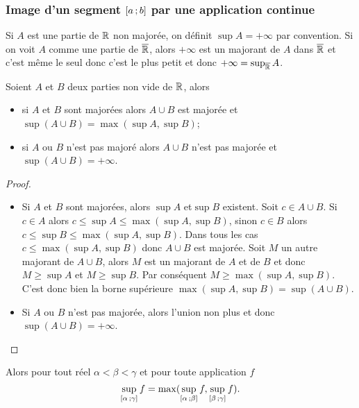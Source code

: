 \subsubsection[Image continue d'un segment]{Image d'un segment
\(\left[ a \, ; {} b \right]\) par une application continue}

Si \(A\) est une partie de \(\mathbb{R}\) non majorée, on définit \(\sup A = + \infty\)
par convention. Si on voit \(A\) comme une partie de \(\overline{\mathbb{R}}\), alors
\(+\infty\) est un majorant de \(A\) dans \(\overline{\mathbb{R}}\) et c'est même le seul donc
c'est le plus petit et donc \(+\infty=\sup_{\overline{\mathbb{R}}} A\).

\begin{lemme}
  Soient \(A\) et \(B\) deux parties non vide de \(\mathbb{R}\), alors
  \begin{itemize}
    \item si \(A\) et \(B\) sont majorées alors \(A \cup B\) est majorée et
      \(\sup(A\cup B)=\max(\sup A, \sup B)\);
    \item si \(A\) ou \(B\) n'est pas majoré alors \(A \cup B\) n'est pas
      majorée et \(\sup(A\cup B)=+\infty\).
  \end{itemize}
\end{lemme}
\begin{proof}
  \begin{itemize}
    \item Si \(A\) et \(B\) sont majorées, alors \(\sup A\) et\(\sup B\)
      existent. Soit \(c \in A \cup B\). Si \(c \in A\) alors \(c \leqslant \sup
      A \leqslant \max(\sup A, \sup B)\), sinon \(c \in B\) alors \(c \leqslant
      \sup B \leqslant \max(\sup A, \sup B)\). Dans tous les cas \(c \leqslant
      \max(\sup A, \sup B)\) donc \(A \cup B\) est majorée. Soit \(M\) un autre
      majorant de \(A \cup B\), alors \(M\) est un majorant de \(A\) et de \(B\)
      et donc \(M \geqslant \sup A\) et \(M \geqslant \sup B\). Par conséquent
      \(M \geqslant \max(\sup A, \sup B)\). C'est donc bien la borne supérieure
      \(\max(\sup A, \sup B)=\sup(A \cup B)\).
    \item Si \(A\) ou \(B\) n'est pas majorée, alors l'union non plus et donc
      \(\sup(A\cup B)=+\infty\).
  \end{itemize}
\end{proof}
Alors pour tout réel \(\alpha < \beta< \gamma\) et pour toute application \(f\)
\begin{equation}
  \sup\limits_{\left[ \alpha \, ; {} \gamma \right]}f =
  \max(\sup\limits_{\left[ \alpha \, ; {} \beta \right]}f,
  \sup\limits_{\left[ \beta \, ; {} \gamma \right]}f).
\end{equation}
